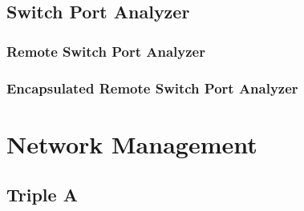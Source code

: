 \section[SPAN]{Switch Port Analyzer}

\subsection[RSPAN]{Remote Switch Port Analyzer}

\subsection[ERSPAN]{Encapsulated Remote Switch Port Analyzer}

\chapter[Network Mgmt]{Network Management}

\section[AAA]{Triple A}



\newpage

